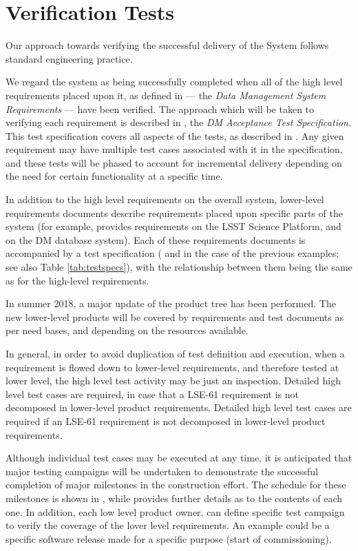 \section{Verification Tests \label{sect:approach}}

Our approach towards verifying the successful delivery of the \product{} System follows standard engineering practice.

We regard the system as being successfully completed when all of the high level requirements placed upon it, as defined in  --- the \emph{Data Management System Requirements} --- have been verified.
The approach which will be taken to verifying each requirement is described in , the \emph{DM Acceptance Test Specification}.
This test specification covers all aspects of the tests, as described in .
Any given requirement may have multiple test cases associated with it in the specification, and these tests will be phased to account for incremental delivery depending on the need for certain functionality at a specific time.

In addition to the high level requirements on the overall \product{} system, lower-level requirements documents describe requirements placed upon specific parts of the system (for example,  provides requirements on the LSST Science Platform, and  on the DM database system).
Each of these requirements documents is accompanied by a test specification ( and  in the case of the previous examples; see also Table \ref{tab:testspecs}), with the relationship between them being the same as for the high-level requirements.

In summer 2018, a major update of the \product{} product tree has been performed. The new lower-level products will be covered by requirements and test documents as per need bases, and depending on the resources available.

In general, in order to avoid duplication of test definition and execution, when a requirement is flowed down to lower-level requirements, and therefore tested at lower level, the high level test activity may be just an inspection.
Detailed high level test cases are required, in case that a LSE-61 requirement is not decomposed in lower-level product requirements.
Detailed high level test cases are required if an  LSE-61 requirement is not decomposed in lower-level product requirements.

Although individual test cases may be executed at any time, it is anticipated that major testing campaigns will be undertaken to demonstrate the successful completion of major milestones in the \product{} construction effort.
The schedule for these milestones is shown in , while  provides further details as to the contents of each one.
In addition, each low level product owner, can define specific test campaign to verify the coverage of the lover level requirements.
An example could be a specific software release made for a specific purpose (start of commissioning).

